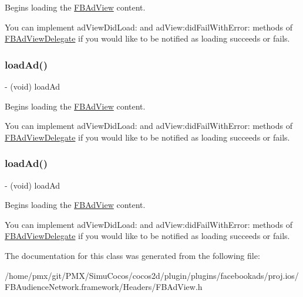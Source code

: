 Begins loading the \hyperlink{interfaceFBAdView}{F\+B\+Ad\+View} content.

You can implement {\ttfamily ad\+View\+Did\+Load\+:} and {\ttfamily ad\+View\+:did\+Fail\+With\+Error\+:} methods of {\ttfamily \hyperlink{classFBAdViewDelegate-p}{F\+B\+Ad\+View\+Delegate}} if you would like to be notified as loading succeeds or fails. \mbox{\label{interfaceFBAdView_acb5962ac98e3645dd53893d98d5b9564}} 
\subsubsection{\texorpdfstring{load\+Ad()}{loadAd()}\hspace{0.1cm}{\footnotesize\ttfamily [4/5]}}
{\footnotesize\ttfamily -\/ (void) load\+Ad \begin{DoxyParamCaption}{ }\end{DoxyParamCaption}}

Begins loading the \hyperlink{interfaceFBAdView}{F\+B\+Ad\+View} content.

You can implement {\ttfamily ad\+View\+Did\+Load\+:} and {\ttfamily ad\+View\+:did\+Fail\+With\+Error\+:} methods of {\ttfamily \hyperlink{classFBAdViewDelegate-p}{F\+B\+Ad\+View\+Delegate}} if you would like to be notified as loading succeeds or fails. \mbox{\label{interfaceFBAdView_acb5962ac98e3645dd53893d98d5b9564}} 
\subsubsection{\texorpdfstring{load\+Ad()}{loadAd()}\hspace{0.1cm}{\footnotesize\ttfamily [5/5]}}
{\footnotesize\ttfamily -\/ (void) load\+Ad \begin{DoxyParamCaption}{ }\end{DoxyParamCaption}}

Begins loading the \hyperlink{interfaceFBAdView}{F\+B\+Ad\+View} content.

You can implement {\ttfamily ad\+View\+Did\+Load\+:} and {\ttfamily ad\+View\+:did\+Fail\+With\+Error\+:} methods of {\ttfamily \hyperlink{classFBAdViewDelegate-p}{F\+B\+Ad\+View\+Delegate}} if you would like to be notified as loading succeeds or fails. 

The documentation for this class was generated from the following file\+:\begin{DoxyCompactItemize}
\item 
/home/pmx/git/\+P\+M\+X/\+Simu\+Cocos/cocos2d/plugin/plugins/facebookads/proj.\+ios/\+F\+B\+Audience\+Network.\+framework/\+Headers/F\+B\+Ad\+View.\+h\end{DoxyCompactItemize}

